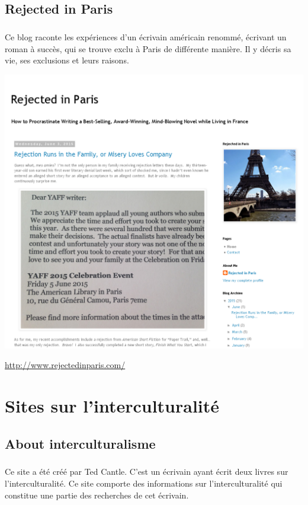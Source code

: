 \section{Rejected in Paris}

\paragraph{} Ce blog raconte les expériences d'un écrivain américain renommé,
écrivant un roman à succès, qui se trouve exclu à Paris de différente manière.
Il y décris sa vie, ses exclusions et leurs raisons.

\begin{center}
	\includegraphics[scale=0.25]{Rejected.png}
\end{center}
\url{http://www.rejectedinparis.com/}

\chapter[Interculturalité]{Sites sur l'interculturalité}

\section{About interculturalisme}

\paragraph{} Ce site a été créé par Ted Cantle. C'est un écrivain ayant écrit
deux livres sur l'interculturalité. Ce site comporte des informations sur
l'interculturalité  qui constitue une partie des recherches de cet écrivain.

